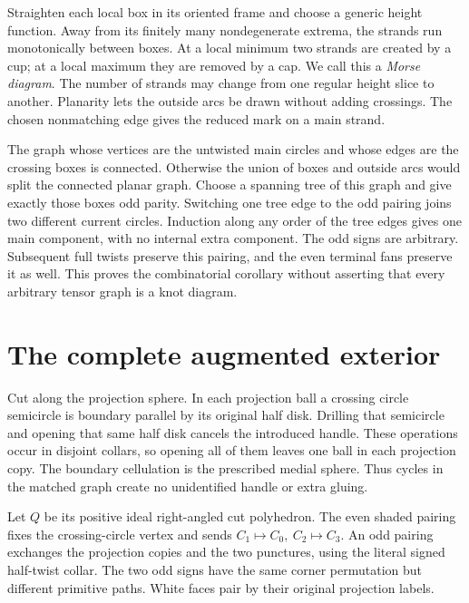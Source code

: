 Straighten each local box in its oriented frame and choose a generic
height function. Away from its finitely many nondegenerate extrema,
the strands run monotonically between boxes. At a local minimum two
strands are created by a cup; at a local maximum they are removed by a
cap. We call this a \emph{Morse diagram}. The number of strands may
change from one regular height slice to another. Planarity lets the
outside arcs be drawn without adding crossings. The chosen nonmatching
edge gives the reduced mark on a main strand.

The graph whose vertices are the untwisted main circles and whose
edges are the crossing boxes is connected. Otherwise the union of
boxes and outside arcs would split the connected planar graph.
Choose a spanning tree of this graph and give exactly those boxes
odd parity. Switching one tree edge to the odd pairing joins two
different current circles. Induction along any order of the tree
edges gives one main component, with no internal extra component.
The odd signs are arbitrary. Subsequent full twists preserve this
pairing, and the even terminal fans preserve it as well. This proves
the combinatorial corollary without asserting that every arbitrary
tensor graph is a knot diagram.

\section{The complete augmented exterior}
\label{morse:complete-exterior}

Cut along the projection sphere. In each projection ball a crossing
circle semicircle is boundary parallel by its original half disk.
Drilling that semicircle and opening that same half disk cancels the
introduced handle. These operations occur in disjoint collars, so
opening all of them leaves one ball in each projection copy. The
boundary cellulation is the prescribed medial sphere. Thus cycles in the
matched graph create no unidentified handle or extra gluing.

Let \(Q\) be its positive ideal right-angled cut polyhedron. The even
shaded pairing fixes the crossing-circle vertex and sends
\(C_1\mapsto C_0,\ C_2\mapsto C_3\). An odd pairing exchanges the
projection copies and the two punctures, using the literal signed
half-twist collar. The two odd signs have the same corner permutation
but different primitive paths. White faces pair by their original
projection labels.

